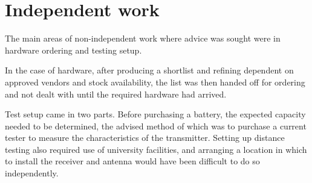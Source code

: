 \documentclass[11pt]{article}
\begin{document}



\section{Independent work}
The main areas of non-independent work where advice was sought were in hardware ordering and testing setup. 

In the case of hardware, after producing a shortlist and refining dependent on approved vendors and stock availability, 
the list was then handed off for ordering and not dealt with until the required hardware had arrived. 

Test setup came in two parts. Before purchasing a battery, the expected capacity needed to be determined, 
the advised method of which was to purchase a current tester to measure the characteristics of the transmitter. 
Setting up distance testing also required use of university facilities, and arranging a location in which to 
install the receiver and antenna would have been difficult to do so independently. 
\end{document}
